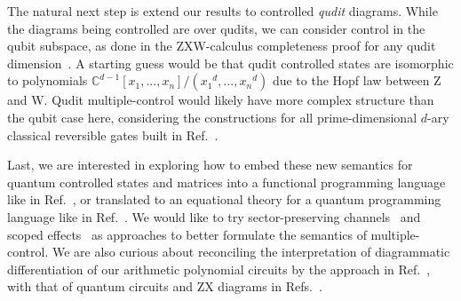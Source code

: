 The natural next step is extend our results to controlled \textit{qudit} diagrams.
While the diagrams being controlled are over qudits, we can consider control in the qubit subspace, as done in the ZXW-calculus completeness proof for any qudit dimension~\cite{poor2023completeness}.
A starting guess would be that qudit controlled states are isomorphic to polynomials $\mathbb{C}^{d-1}[x_1,...,x_n]/({x_1}^d,...,{x_n}^d)$ due to the Hopf law between Z and W.
Qudit multiple-control would likely have more complex structure than the qubit case here, considering the constructions for all prime-dimensional $d$-ary classical reversible gates built in Ref.~\cite{Roy2023quditzh}.

Last, we are interested in exploring how to embed these new semantics for quantum controlled states and matrices into a functional programming language like in Ref.~\cite{rennela2020clctrllinlogic}, or translated to an equational theory for a quantum programming language like in Ref.~\cite{staton2015algqpl}.
We would like to try sector-preserving channels~\cite{Vanrietvelde2021ctrlsector} and scoped effects~\cite{lindley2024scoped} as approaches to better formulate the semantics of multiple-control.
We are also curious about reconciling the interpretation of diagrammatic differentiation of our arithmetic polynomial circuits by the approach in Ref.~\cite{wilson2023diffpolycirc}, with that of quantum circuits and ZX diagrams in Refs.~\cite{toumi2021diagdiff, wang2022diffintzx, jeandel2024adddiffzx}.